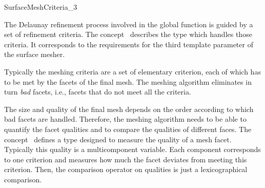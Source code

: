

\begin{ccRefConcept}{SurfaceMeshCriteria_3}

\ccDefinition
  
The Delaunay refinement process involved in  the 
global function  
is guided by a set of refinement criteria.
The concept \ccRefName\ describes the type  which
handles those criteria. 
It corresponds to the requirements for the third template parameter
 of the surface mesher.

Typically the meshing criteria are a set
of elementary criterion, each of which
has to be met by  the facets of the final mesh.
The meshing algorithm eliminates in turn  {\em bad} facets, i.e.,
facets that do not meet all the criteria.

The size and quality of the final mesh 
depends on the order according to which bad facets
are handled. Therefore, the meshing algorithm 
needs to be able to quantify the facet qualities and to compare
the qualities of different faces.
The concept \ccRefName\ 
defines a type  designed to measure
the quality of a mesh facet. 
Typically this quality
is a multicomponent variable.  Each component corresponds to
one criterion and measures how much the facet deviates from
meeting this criterion. Then, the  comparison operator on qualities
is just a lexicographical comparison.

\ccHasModels


\end{ccRefConcept}


